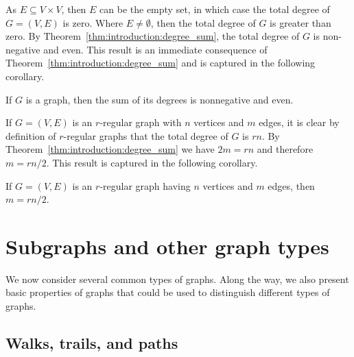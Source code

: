 As $E \subseteq V \times V$, then $E$ can be the empty set, in which
case the total degree of $G = (V, E)$ is zero. Where $E \neq
\emptyset$, then the total degree of $G$ is greater than zero. By
Theorem~\ref{thm:introduction:degree_sum}, the total degree of $G$ is
non-negative and even. This result is an immediate consequence of
Theorem~\ref{thm:introduction:degree_sum} and is captured in the
following corollary.

\begin{corollary}
\label{cor:introduction:degree_sum_even}
If $G$ is a graph, then the sum of its degrees is nonnegative
and even.
\end{corollary}

If $G = (V, E)$ is an $r$-regular graph with $n$ vertices and $m$
edges, it is clear by definition of $r$-regular graphs that the total
degree of $G$ is $rn$. By Theorem~\ref{thm:introduction:degree_sum} we
have $2m = rn$ and therefore $m = rn / 2$. This result is captured in
the following corollary.

\begin{corollary}
If $G = (V, E)$ is an $r$-regular graph having $n$ vertices and $m$
edges, then $m = rn / 2$.
\end{corollary}



\section{Subgraphs and other graph types}
\label{sec:introduction:subgraphs_graph_types}

We now consider several common types of graphs. Along the way, we also
present basic properties of graphs that could be used to distinguish
different types of graphs.



\subsection{Walks, trails, and paths}
\label{subsec:introduction:walks_trails_paths}

